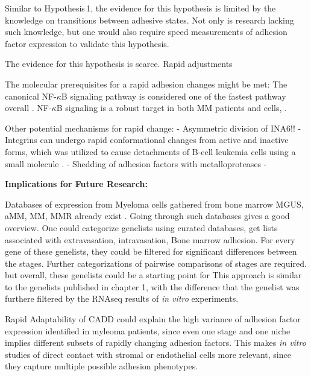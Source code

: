 Similar to Hypothesis\,1, the evidence for this hypothesis is limited by
the knowledge on transitions between adhesive states. Not only is research lacking
such knowledge, but one would also require speed measurements of adhesion factor
expression to validate this hypothesis.

The
evidence for this hypothesis is scarce.
Rapid adjustments



The molecular prerequisites  for a rapid adhesion changes might be met:
The
canonical NF-$\kappa$B signaling pathway is considered one of the fastest
pathway overall \cite{gallego-sellesFastRegulationNFkB2022,
      zarnegarNoncanonicalNFkBActivation2008}. NF-$\kappa$B signaling is a
robust target in both MM patients and \INA cells,
\cite{sarinEvaluatingEfficacyMultiple2020}.



Other potential mechanisms for rapid change:
- Asymmetric division of INA6!!
- Integrins can undergo rapid conformational changes from active and inactive
forms, which was utilized to cause detachments of B-cell leukemia cells
using a small molecule \cite{ruanVitroVivoEffects2022}.
- Shedding of adhesion factors with metalloproteases
-



\textbf{Implications for Future Research:}


Databases of expression from Myeloma cells gathered from bone
marrow \ac{MGUS}, \ac{aMM}, \ac{MM}, \ac{MMR} already exist
\citet{akhmetzyanovaDynamicCD138Surface2020,
      seckingerCD38ImmunotherapeuticTarget2018}. Going through such databases gives a
good overview. One could categorize genelists using curated databases, get lists
associated with extravasation, intravasation, Bone marrow adhesion. For every
gene of these genelists, they could be filtered for significant differences
between the stages. Further categorizations of pairwise comparisons of stages
are required. but overall, these genelists could be a starting point for This
approach is similar to the genelists published in chapter 1, with the difference
that the genelist was furthere filtered by the RNAseq results of \textit{in
      vitro} experiments.


Rapid Adaptability of \ac{CADD} could explain the high variance of adhesion
factor expression identified in myleoma patients, since even one stage and one
niche implies different subsets of rapidly changing adhesion factors. This makes
\textit{in vitro} studies of direct contact with stromal or endothelial cells
more relevant, since they capture multiple possible adhesion phenotypes.

